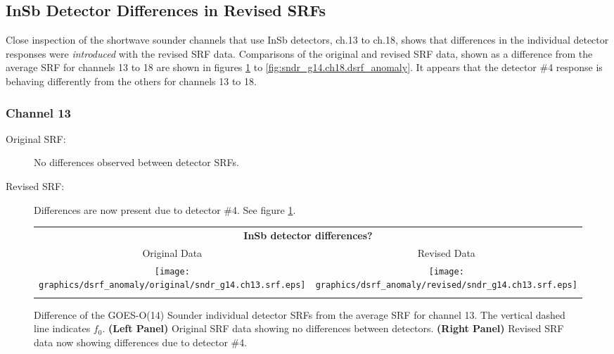 \subsection{InSb Detector Differences in Revised SRFs}
Close inspection of the shortwave sounder channels that use InSb detectors, ch.13 to ch.18, shows that differences in the individual detector responses were \emph{introduced} with the revised SRF data. Comparisons of the original and revised SRF data, shown as a difference from the average SRF for channels 13 to 18 are shown in figures \ref{fig:sndr_g14.ch13.dsrf_anomaly} to \ref{fig:sndr_g14.ch18.dsrf_anomaly}. It appears that the detector \#4 response is behaving differently from the others for channels 13 to 18.

\subsubsection{Channel 13}
\begin{description}
  \item[Original SRF:] No differences observed between detector SRFs.
  \item[Revised SRF:]  Differences are now present due to detector \#4. See figure \ref{fig:sndr_g14.ch13.dsrf_anomaly}.
\end{description}

\begin{figure}[htp]
  \centering
  \begin{tabular}{c c}
    \multicolumn{2}{c}{\textsf{\bfseries InSb detector differences?}} \\
    \hspace{1.5em}\textsf{Original Data} &
    \hspace{1.5em}\textsf{Revised Data} \\
    \texttt{[image: graphics/dsrf\_anomaly/original/sndr\_g14.ch13.srf.eps]} &
    \texttt{[image: graphics/dsrf\_anomaly/revised/sndr\_g14.ch13.srf.eps]} \\\\
  \end{tabular}
  \caption{Difference of the GOES-O(14) Sounder individual detector SRFs from the average SRF for channel 13. The vertical dashed line indicates $f_0$. \textbf{(Left Panel)} Original SRF data showing no differences between detectors. \textbf{(Right Panel)} Revised SRF data now showing differences due to detector \#4.}
  \label{fig:sndr_g14.ch13.dsrf_anomaly}
\end{figure}

